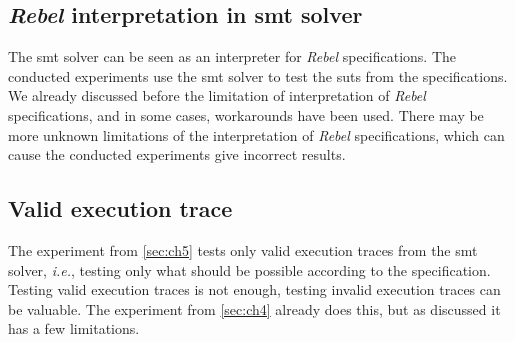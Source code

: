 \subsection*{\textit{Rebel} interpretation in \gls{smt} solver}
The \gls{smt} solver can be seen as an interpreter for \textit{Rebel} specifications. The
conducted experiments use the \gls{smt} solver to test the \gls{sut}s from the
specifications. We already discussed before the limitation of interpretation of
\textit{Rebel} specifications, and in some cases, workarounds have been used. There may
be more unknown limitations of the interpretation of \textit{Rebel} specifications, which
can cause the conducted experiments give incorrect results.

\subsection*{Valid execution trace}
The experiment from \autoref{sec:ch5} tests only valid execution traces from
the \gls{smt} solver, \textit{i.e.}, testing only what should be possible according to
the specification. Testing valid execution traces is not enough, testing
invalid execution traces can be valuable. The experiment from
\autoref{sec:ch4} already does this, but as discussed it has a few limitations.
